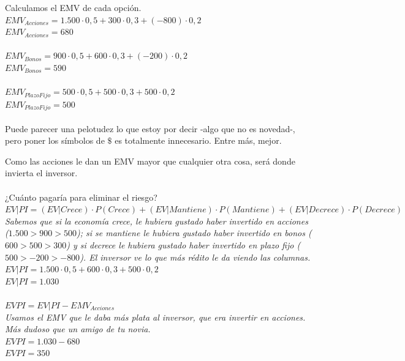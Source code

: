 \documentclass{article}
\begin{document}
            Calculamos el EMV de cada opción.
            \\
            \(EMV_{Acciones} = 1.500 \cdot 0,5 + 300 \cdot 0,3 + (-800) \cdot 0,2 \) \\
            \(EMV_{Acciones} = 680 \) \\ \\
            \(EMV_{Bonos} = 900 \cdot 0,5 + 600 \cdot 0,3 + (-200) \cdot 0,2 \) \\
            \(EMV_{Bonos} = 590 \)\\ \\
            \(EMV_{Plazo Fijo} = 500 \cdot 0,5 + 500 \cdot 0,3 + 500 \cdot 0,2\) \\
            \(EMV_{Plazo Fijo} = 500\)\\ \\
            Puede parecer una pelotudez lo que estoy por decir -algo que no es novedad-, pero poner los símbolos de $\mathdollar$ es totalmente innecesario. Entre más, mejor.
            
            Como las acciones le dan un EMV mayor que cualquier otra cosa, será donde invierta el inversor.
            \\
            \\
            ¿Cuánto pagaría para eliminar el riesgo?
            \\
            \(EV|PI = (EV|Crece) \cdot P(Crece) + (EV|Mantiene) \cdot P(Mantiene) + (EV|Decrece) \cdot P(Decrece)\) \\
            \textit{Sabemos que si la economía crece, le hubiera gustado haber invertido en acciones ($1.500 > 900 > 500$); si se mantiene le hubiera gustado haber invertido en bonos ($600 > 500 > 300$) y si decrece le hubiera gustado haber invertido en plazo fijo ($500 > -200 > -800$). El inversor ve lo que más rédito le da viendo las columnas.} \\
            \(EV|PI = 1.500 \cdot 0,5 + 600 \cdot 0,3 + 500 \cdot 0,2\) \\
            \(EV|PI = 1.030\) \\
            \\
            \(EVPI = EV|PI - EMV_{Acciones}\) \\
            \textit{Usamos el EMV que le daba más plata al inversor, que era invertir en acciones. Más dudoso que un amigo de tu novia.}\\
            \(EVPI = 1.030 - 680\) \\
            \(EVPI = 350\)
    
\end{document}
